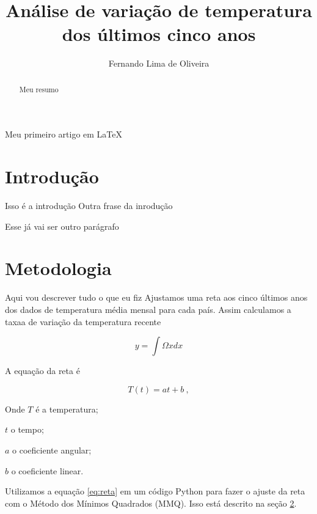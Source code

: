 \documentclass{article}
\begin{document}
\title{Análise de variação de temperatura dos últimos cinco anos}
\author{Fernando Lima de Oliveira}
\maketitle

\begin{abstract}
Meu resumo
\end{abstract}

Meu primeiro artigo em LaTeX

\section{Introdução}

Isso é a introdução
Outra frase da inrodução

Esse já vai ser outro parágrafo

\section{Metodologia}
\label{sec:metodos}

Aqui vou descrever tudo o que eu fiz
Ajustamos uma reta aos cinco últimos anos dos dados
de temperatura média mensal para cada país.
Assim calculamos a taxaa de variação da temperatura recente

\begin{equation}
y = \int \Omega x dx
\end{equation}

A equação da reta é

\begin{equation}
T(t) = a t + b \ ,
\label{eq:reta}
\end{equation}

\noindent
Onde $T$ é a temperatura; 

\noindent
$t$ o tempo; 

\noindent
$a$ o coeficiente angular; 

\noindent
$b$ o coeficiente linear.

Utilizamos a equação \ref{eq:reta} em um código Python para fazer o ajuste da reta com 
o Método dos Mínimos Quadrados (MMQ). Isso está descrito na seção \ref{sec:metodos}.
\end{document}
